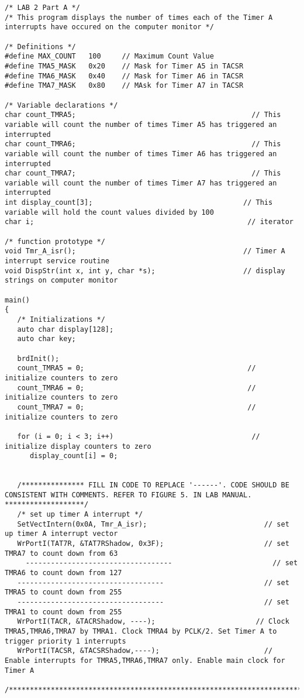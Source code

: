 \begin{lstlisting}
/* LAB 2 Part A */
/* This program displays the number of times each of the Timer A interrupts have occured on the computer monitor */

/* Definitions */
#define MAX_COUNT   100     // Maximum Count Value
#define TMA5_MASK   0x20    // Mask for Timer A5 in TACSR
#define TMA6_MASK   0x40    // Mask for Timer A6 in TACSR
#define TMA7_MASK   0x80    // MAsk for Timer A7 in TACSR

/* Variable declarations */
char count_TMRA5;                                          // This variable will count the number of times Timer A5 has triggered an interrupted
char count_TMRA6;                                          // This variable will count the number of times Timer A6 has triggered an interrupted
char count_TMRA7;                                          // This variable will count the number of times Timer A7 has triggered an interrupted
int display_count[3];                                    // This variable will hold the count values divided by 100
char i;                                                   // iterator

/* function prototype */
void Tmr_A_isr();                                        // Timer A interrupt service routine
void DispStr(int x, int y, char *s);                     // display strings on computer monitor

main()
{
   /* Initializations */
   auto char display[128];
   auto char key;

   brdInit();
   count_TMRA5 = 0;                                       // initialize counters to zero
   count_TMRA6 = 0;                                       // initialize counters to zero
   count_TMRA7 = 0;                                       // initialize counters to zero

   for (i = 0; i < 3; i++)                                 // initialize display counters to zero
      display_count[i] = 0;


   /*************** FILL IN CODE TO REPLACE '------'. CODE SHOULD BE CONSISTENT WITH COMMENTS. REFER TO FIGURE 5. IN LAB MANUAL. *******************/
   /* set up timer A interrupt */
   SetVectIntern(0x0A, Tmr_A_isr);                            // set up timer A interrupt vector
   WrPortI(TAT7R, &TAT7RShadow, 0x3F);                        // set TMRA7 to count down from 63
     -----------------------------------                        // set TMRA6 to count down from 127
   -----------------------------------                        // set TMRA5 to count down from 255
   -----------------------------------                        // set TMRA1 to count down from 255
   WrPortI(TACR, &TACRShadow, ----);                        // Clock TMRA5,TMRA6,TMRA7 by TMRA1. Clock TMRA4 by PCLK/2. Set Timer A to trigger priority 1 interrupts
   WrPortI(TACSR, &TACSRShadow,----);                         // Enable interrupts for TMRA5,TMRA6,TMRA7 only. Enable main clock for Timer A
   /************************************************************************************************************************************************/



\end{lstlisting}
